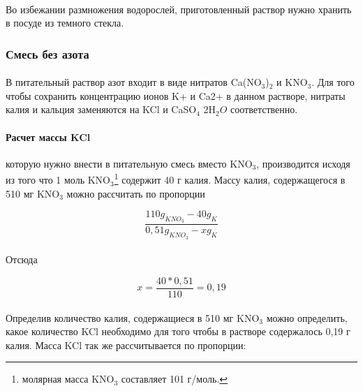 \paragraph*{\warningsign}Во избежании размножения водорослей, приготовленный раствор нужно хранить в посуде из темного стекла.
	
\subsubsection*{Смесь без азота}
	
\paragraph*{}В питательный раствор азот входит в виде нитратов Ca(NO${_3}$)${_2}$ и KNO$_3$. Для того чтобы сохранить концентрацию ионов K+ и Ca2+ в данном растворе, нитраты калия и кальция заменяются на KCl и CaSO${_4}$ \textperiodcentered 2H${_2}O$ соответственно.
	
	\paragraph*{Расчет массы \hypertarget{potashyum_mass}{KCl}} которую нужно внести в питательную смесь вместо KNO$_3$, производится исходя из того что 1 моль KNO$_3$\footnote{молярная масса KNO$_3$ составляет 101 г/моль.} содержит 40 г калия. Массу калия, содержащегося в 510 мг KNO$_3$ можно  рассчитать по пропорции
	
	\begin{equation}
		\frac{110 g_{KNO_3} - 40 g_{K}}{0,51 g_{KNO_3} - x g_{K}}
	\end{equation}	 

\paragraph*{}Отсюда	

\begin{equation}
		x = \frac{40 * 0,51}{110} = 0,19
	\end{equation}
	
\paragraph*{}Определив количество калия, содержащиеся в 510 мг KNO$_3$ можно определить, какое количество KCl необходимо для того чтобы в растворе содержалось 0,19 г калия. Масса KCl так же рассчитывается по пропорции:

